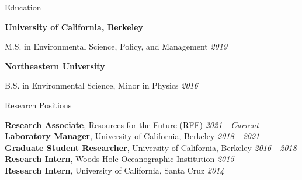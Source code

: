 \documentclass{resume} %
\begin{document}

\begin{rSection}{Education}

{\bf University of California, Berkeley}
\vspace{-7pt}
\begin{adjustwidth}{12pt}{}
{\small M.S. in Environmental Science, Policy, and Management} \hfill {\em 2019}
\end{adjustwidth}

{\bf Northeastern University}
\vspace{-7pt}
\begin{adjustwidth}{12pt}{}
{\small B.S. in Environmental Science, Minor in Physics} \hfill {\em 2016}
\end{adjustwidth}

\end{rSection}
\begin{rSection}{Research Positions}

{\bf Research Associate}{, Resources for the Future (RFF)} \hfill {\em 2021 - Current}\\
{\bf Laboratory Manager}{, University of California, Berkeley} \hfill {\em 2018 - 2021}\\
{\bf Graduate Student Researcher}{, University of California, Berkeley} \hfill {\em 2016 - 2018}\\
{\bf Research Intern}{, Woods Hole Oceanographic Institution} \hfill {\em 2015}\\
{\bf Research Intern}{, University of California, Santa Cruz} \hfill {\em 2014}
\end{rSection}
\end{document}
